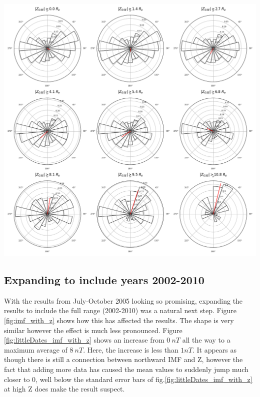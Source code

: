 \documentclass[12pt]{article}
\newenvironment{Figure}
  {\par\medskip\noindent\minipage{\linewidth}}
  {\endminipage\par\medskip}
\begin{document}
\begin{Figure}
    \centering
    \includegraphics[width=\textwidth]{littleDates_imf_angle_hist.png}
    \label{fig:littleDates_imf_angle_hist}
\end{Figure}

\subsection{Expanding to include years 2002-2010}
With the results from July-October 2005 looking so promising, expanding the results to include the full range (2002-2010) was a natural next step. Figure \ref{fig:imf_with_z} shows how this has affected the results. The shape is very similar however the effect is much less pronounced. Figure \ref{fig:littleDates_imf_with_z} shows an increase from $0\ nT$ all the way to a maximum average of $8\ nT$. Here, the increase is less than $1nT$. It appears as though there is still a connection between northward IMF and Z, however the fact that adding more data has caused the mean values to suddenly jump much closer to 0, well below the standard error bars of fig.\ref{fig:littleDates_imf_with_z} at high Z does make the result suspect.
\end{document}
